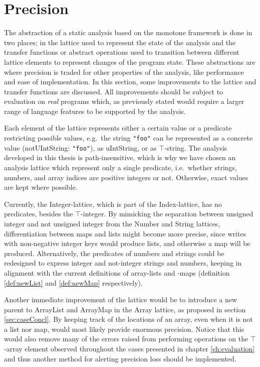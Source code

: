 \section{Precision}
\label{sec:future2}
The abstraction of a static analysis based on the monotone framework is done in two places; in the lattice used to represent the state of the analysis and the transfer functions or abstract operations used to transition between different lattice elements to represent changes of the program state. These abstractions are where precision is traded for other properties of the analysis, like performance and ease of implementation. In this section, some improvements to the lattice and transfer functions are discussed. All improvements should be subject to evaluation on \textit{real} programs which, as previously stated would require a larger range of language features to be supported by the analysis. 

Each element of the lattice represents either a certain value or a predicate restricting possible values, e.g.\ the string \texttt{"foo"} can be represented as a concrete value (notUIntString: \texttt{"foo"}), as uIntString, or as $\top$-string. The analysis developed in this thesis is path-insensitive, which is why we have chosen an analysis lattice which represent only a single predicate, i.e.\ whether strings, numbers, and array indices are positive integers or not. Otherwise, exact values are kept where possible. 

Currently, the Integer-lattice, which is part of the Index-lattice, has no predicates, besides the $\top$-integer. By mimicking the separation between unsigned integer and not unsigned integer from the Number and String lattices, differentiation between maps and lists might become more precise, since writes with non-negative integer keys would produce lists, and otherwise a map will be produced. Alternatively, the predicates of numbers and strings could be redesigned to express integer and not-integer strings and numbers, keeping in alignment with the current definitions of array-lists and -maps (definition \ref{def:newList} and \ref{def:newMap} respectively). 

Another immediate improvement of the lattice would be to introduce a new parent to ArrayList and ArrayMap in the Array lattice, as proposed in section \ref{sec:caseConcl}. By keeping track of the locations of an array, even when it is not a list nor map, would most likely provide enormous precision. Notice that this would also remove many of the errors raised from performing operations on the $\top$-array element observed throughout the cases presented in chapter \ref{ch:evaluation} and thus another method for alerting precision loss should be implemented. 

